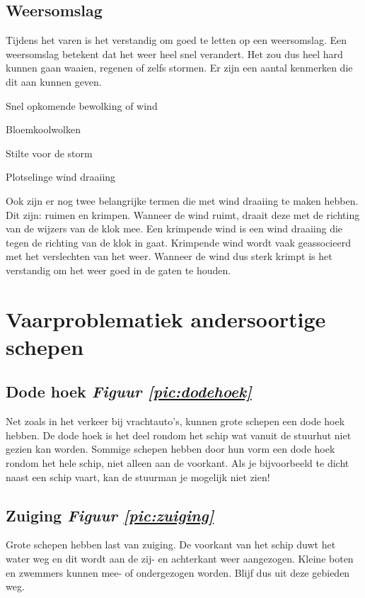 \subsection{Weersomslag}
Tijdens het varen is het verstandig om goed te letten op een weersomslag. Een weersomslag betekent dat het weer heel snel verandert. Het zou dus heel hard kunnen gaan waaien, regenen of zelfs stormen. Er zijn een aantal kenmerken die dit aan kunnen geven. 
\begin{itemize}
    \begin{multicols}{2}
    \item Snel opkomende bewolking of wind
    \item Bloemkoolwolken
    \item Stilte voor de storm
    \item Plotselinge wind draaiing
    \end{multicols}
\end{itemize}
Ook zijn er nog twee belangrijke termen die met wind draaiing te maken hebben. Dit zijn: ruimen en krimpen. Wanneer de wind ruimt, draait deze met de richting van de wijzers van de klok mee. Een krimpende wind is een wind draaiing die tegen de richting van de klok in gaat. Krimpende wind wordt vaak geassocieerd met het verslechten van het weer. Wanneer de wind dus sterk krimpt is het verstandig om het weer goed in de gaten te houden.

\newpage
\section{Vaarproblematiek andersoortige schepen}
\subsection{Dode hoek \hfill \textit{Figuur \ref{pic:dodehoek}}}
Net zoals in het verkeer bij vrachtauto's, kunnen grote schepen een dode hoek hebben. De dode hoek is het deel rondom het schip wat vanuit de stuurhut niet gezien kan worden. Sommige schepen hebben door hun vorm een dode hoek rondom het hele schip, niet alleen aan de voorkant. Als je bijvoorbeeld te dicht naast een schip vaart, kan de stuurman je mogelijk niet zien!

\subsection{Zuiging \hfill \textit{Figuur \ref{pic:zuiging}}}
Grote schepen hebben last van zuiging. De voorkant van het schip duwt het water weg en dit wordt aan de zij- en achterkant weer aangezogen. Kleine boten en zwemmers kunnen mee- of ondergezogen worden. Blijf dus uit deze gebieden weg.


